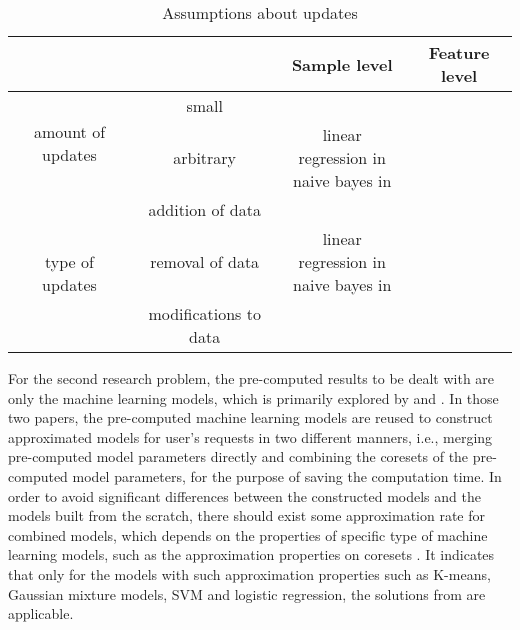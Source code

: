 \begin{table}[h]
    \centering
    \begin{tabular}{|c|c|c|c|}\hline
        &&Sample level& Feature level\\\hline
    \multirow{2}{*}{amount of updates}&small&\cite{deshpande2006mauvedb, gupta2015processing,koc2011incrementally, nikolic2014linview}  & \cite{nikolic2014linview} \\\hhline{~---}
    &arbitrary&\makecell{linear regression in \cite{deshpande2006mauvedb, gupta2015processing}\\ naive bayes in \cite{gupta2015processing}} & \\\hline
    \multirow{3}{*}{type of updates}&addition of data&\cite{deshpande2006mauvedb, gupta2015processing,koc2011incrementally} &  \\\hhline{~---}
    &removal of data&\makecell{linear regression in \cite{deshpande2006mauvedb, gupta2015processing}\\ naive bayes in \cite{gupta2015processing}} &  \\\hhline{~---}
    &modifications to data&\cite{nikolic2014linview} & \cite{nikolic2014linview} \\\hline
    \end{tabular}
    \caption{Assumptions about updates}
    \label{tab:assump_updates}
\end{table}

For the second research problem, the pre-computed results to be dealt with are only the machine learning models, which is primarily explored by \cite{gupta2015processing} and \cite{hasani2018efficient}. In those two papers, the pre-computed machine learning models are reused to construct approximated models for user's requests in two different manners, i.e., merging pre-computed model parameters directly and combining the coresets \cite{agarwal2005geometric} of the pre-computed model parameters, for the purpose of saving the computation time. In order to avoid significant differences between the constructed models and the models built from the scratch, there should exist some approximation rate for combined models, which depends on the properties of specific type of machine learning models, such as the approximation properties on coresets \cite{agarwal2005geometric}. It indicates that only for the models with such approximation properties such as K-means, Gaussian mixture models, SVM and logistic regression, the solutions from \cite{gupta2015processing} are applicable. 

